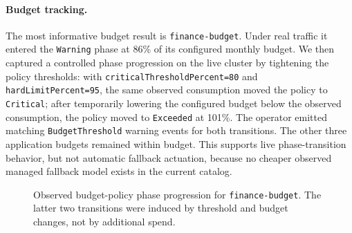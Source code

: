 \paragraph{Budget tracking.}
The most informative budget result is \texttt{finance-budget}. Under real traffic it entered the \texttt{Warning} phase at 86\% of its configured monthly budget. We then captured a controlled phase progression on the live cluster by tightening the policy thresholds: with \texttt{criticalThresholdPercent=80} and \texttt{hardLimitPercent=95}, the same observed consumption moved the policy to \texttt{Critical}; after temporarily lowering the configured budget below the observed consumption, the policy moved to \texttt{Exceeded} at 101\%. The operator emitted matching \texttt{BudgetThreshold} warning events for both transitions. The other three application budgets remained within budget. This supports live phase-transition behavior, but not automatic fallback actuation, because no cheaper observed managed fallback model exists in the current catalog.

\begin{figure}[t]
\centering
{}
\caption{Observed budget-policy phase progression for \texttt{finance-budget}. The latter two transitions were induced by threshold and budget changes, not by additional spend.}
\end{figure}

